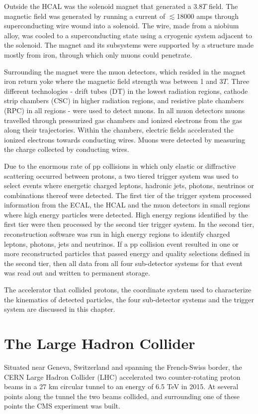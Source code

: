 Outside the HCAL was the solenoid magnet that generated a 3.8$\unit{T}$ field.  The magnetic field was generated by running a current of 
$\lesssim$18000 amps through superconducting wire wound into a solenoid.  The wire, made from a niobium alloy, was 
cooled to a superconducting state using a cryogenic system adjacent to the solenoid.  The magnet and its subsystems 
were supported by a structure made mostly from iron, through which only muons could penetrate.

Surrounding the magnet were the muon detectors, which resided 
in the magnet iron return yoke where the magnetic field strength was between 1 and 3$\unit{T}$.  Three 
different technologies - drift tubes (DT) in the lowest radiation regions, cathode strip chambers (CSC) in higher 
radiation regions, and resistive plate chambers (RPC) in all regions - were used to detect muons.  In all muon detectors 
muons travelled through pressurized gas chambers and ionized electrons from the gas along their 
trajectories.  Within the chambers, electric fields accelerated the ionized electrons towards conducting wires.  Muons 
were detected by measuring the charge collected by conducting wires.

Due to the enormous rate of pp collisions in which only elastic or diffractive scattering occurred between protons, a two tiered trigger 
system was used to select events where energetic charged leptons, hadronic jets, photons, neutrinos or combinations 
thereof were detected.  The first tier of the trigger system processed information from the ECAL, the HCAL and the muon 
detectors in small regions where high energy particles were detected.  High energy regions identified by the first tier 
were then processed by the second tier trigger system.  In the second tier, reconstruction software 
was run in high energy regions to identify charged leptons, photons, jets and neutrinos.  If a pp collision event resulted in 
one or more reconstructed particles that passed energy and quality selections defined in the second tier, then all data 
from all four sub-detector systems for that event was read out and written to permanent storage.

The accelerator that collided protons, the coordinate system used to characterize the kinematics of detected 
particles, the four sub-detector systems and the trigger system are discussed in this chapter.

\section{The Large Hadron Collider}
\label{sec:lhcDescription}
Situated near Geneva, Switzerland and spanning the French-Swiss border, the CERN Large Hadron Collider (LHC) accelerated 
two counter-rotating proton beams in a 27 km circular tunnel \cite{lhcTDR} to an energy of 6.5 TeV in 2015.  At several points along the tunnel 
the two beams collided, and surrounding one of these points the CMS experiment was built.

